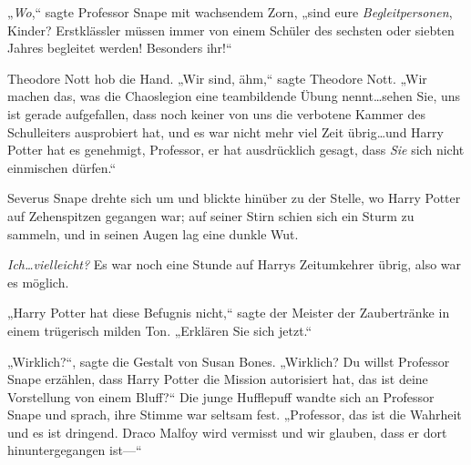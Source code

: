 „\emph{Wo},“ sagte Professor Snape mit wachsendem Zorn, „sind eure \emph{Begleitpersonen}, Kinder? Erstklässler müssen immer von einem Schüler des sechsten oder siebten Jahres begleitet werden! Besonders ihr!“

Theodore Nott hob die Hand. „Wir sind, ähm,“ sagte Theodore Nott.
„Wir machen das, was die Chaoslegion eine teambildende Übung nennt…sehen Sie, uns ist gerade aufgefallen, dass noch keiner von uns die verbotene Kammer des Schulleiters ausprobiert hat, und es war nicht mehr viel Zeit übrig…und Harry Potter hat es genehmigt, Professor, er hat ausdrücklich gesagt, dass \emph{Sie} sich nicht einmischen dürfen.“

Severus Snape drehte sich um und blickte hinüber zu der Stelle, wo Harry Potter auf Zehenspitzen gegangen war; auf seiner Stirn schien sich ein Sturm zu sammeln, und in seinen Augen lag eine dunkle Wut.

\emph{Ich…vielleicht?}
Es war noch eine Stunde auf Harrys Zeitumkehrer übrig, also war es möglich.

„Harry Potter hat diese Befugnis nicht,“ sagte der Meister der Zaubertränke in einem trügerisch milden Ton. „Erklären Sie sich jetzt.“

„Wirklich?“, sagte die Gestalt von Susan Bones. „Wirklich? Du willst Professor Snape erzählen, dass Harry Potter die Mission autorisiert hat, das ist deine Vorstellung von einem Bluff?“ Die junge Hufflepuff wandte sich an Professor Snape und sprach, ihre Stimme war seltsam fest.
„Professor, das ist die Wahrheit und es ist dringend. Draco Malfoy wird vermisst und wir glauben, dass er dort hinuntergegangen ist—“

